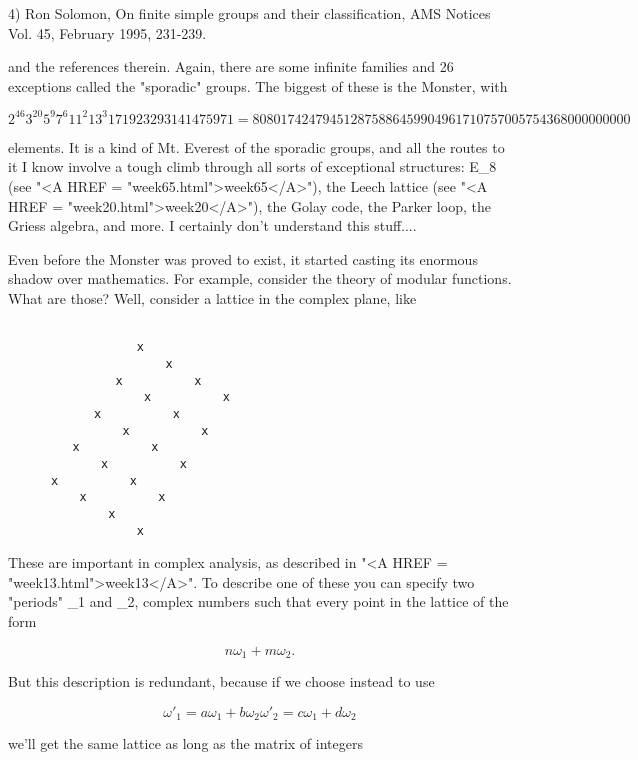 4) Ron Solomon, On finite simple groups and their classification, AMS
Notices Vol. 45, February 1995, 231-239.

and the references therein.  Again, there are some infinite families and
26 exceptions called the "sporadic" groups.  The biggest of these
is the Monster, with 


$$

 2^{46} 3^{20} 5^{9} 7^{6} 11^{2} 13^{3} 17 19 23 29 31 41 47 59 71  = 
 808017424794512875886459904961710757005754368000000000
$$
    

elements.  It is a kind of Mt. Everest of the sporadic groups, and all
the routes to it I know involve a tough climb through all sorts of
exceptional structures: E_{8} (see "<A HREF =
"week65.html">week65</A>"), the Leech lattice (see "<A HREF =
"week20.html">week20</A>"), the Golay code, the Parker loop, the
Griess algebra, and more.  I certainly don't understand this stuff....

Even before the Monster was proved to exist, it started casting its
enormous shadow over mathematics.  For example, consider the theory
of modular functions.  What are those?  Well, consider a lattice in the
complex plane, like 



\begin{verbatim}

                  x
                      x
               x          x
                   x          x 
            x          x
                x          x
         x          x
             x          x
      x          x   
          x          x
              x 
                  x
\end{verbatim}
    

These are important in complex analysis, as described in "<A HREF =
"week13.html">week13</A>".  To describe one of these you can specify
two "periods" \omega _{1} and \omega _{2}, complex numbers
such that every point in the lattice of the form


$$

                   n \omega _{1} + m \omega _{2}.
$$
    

But this description is redundant, because if we choose instead to
use


$$

                 \omega '_{1} = a \omega _{1} + b \omega _{2}

                 \omega '_{2} = c \omega _{1} + d \omega _{2}
$$
    
we'll get the same lattice as long as the matrix of integers

